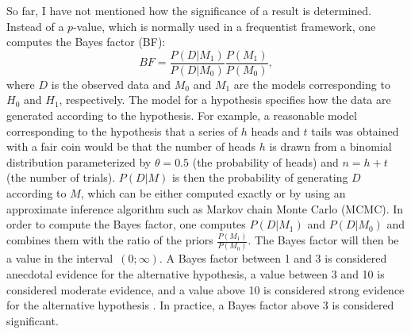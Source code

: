 \documentclass[lucida]{sp} %
\begin{document}
So far, I have not mentioned how the significance of a result is determined. Instead of a $p$-value, which is normally used in a frequentist framework, one computes the Bayes factor (BF):
$$  BF =  \frac{P(D|M_1)}{P(D|M_0)}  \frac{P(M_1)}{P(M_0)}, $$
where $D$ is the observed data and $M_0$ and $M_1$ are the models corresponding to $H_0$ and $H_1$, respectively. The model for a hypothesis specifies how the data are generated according to the hypothesis. For example, a reasonable model corresponding to the hypothesis that a series of $h$ heads and $t$ tails was obtained with a fair coin would be that the number of heads $h$ is drawn from a binomial distribution parameterized by $\theta=0.5$ (the probability of heads)  and $n=h+t$ (the number of trials). $P(D|M)$ is then the probability of generating $D$ according to $M$, which can be either computed exactly or by using an approximate inference algorithm such as Markov chain Monte Carlo (MCMC). In order to compute the Bayes factor, one computes $P(D|M_1)$ and $P(D|M_0)$ and combines them with the ratio of the priors $\frac{P(M_1)}{P(M_0)}$. The Bayes factor will then be a value in the interval~$(0;\infty)$. A Bayes factor between 1 and 3 is considered anecdotal evidence for the alternative hypothesis, a value between 3 and 10 is considered moderate evidence, and a value above 10 is considered strong evidence for the alternative hypothesis \citep{jeffreys1961, lee2013}. In practice, a Bayes factor above 3 is considered significant.
\end{document}
